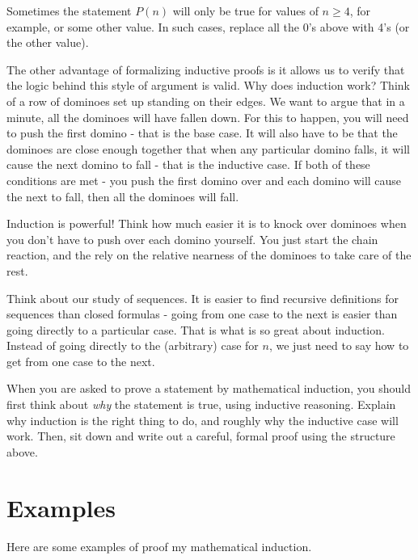 \documentclass[12pt]{article}
\begin{document}
Sometimes the statement $P(n)$ will only be true for values of $n \ge 4$, for example, or some other value.  In such cases, replace all the 0's above with 4's (or the other value).

The other advantage of formalizing inductive proofs is it allows us to verify that the logic behind this style of argument is valid.  Why does induction work?  Think of a row of dominoes set up standing on their edges.  We want to argue that in a minute, all the dominoes will have fallen down.  For this to happen, you will need to push the first domino - that is the base case.  It will also have to be that the dominoes are close enough together that when any particular domino falls, it will cause the next domino to fall - that is the inductive case.  If both of these conditions are met - you push the first domino over and each domino will cause the next to fall, then all the dominoes will fall.

Induction is powerful!  Think how much easier it is to knock over dominoes when you don't have to push over each domino yourself.  You just start the chain reaction, and the rely on the relative nearness of the dominoes to take care of the rest.  

Think about our study of sequences.  It is easier to find recursive definitions for sequences than closed formulas - going from one case to the next is easier than going directly to a particular case.  That is what is so great about induction.  Instead of going directly to the (arbitrary) case for $n$, we just need to say how to get from one case to the next.  

When you are asked to prove a statement by mathematical induction, you should first think about {\em why} the statement is true, using inductive reasoning.  Explain why induction is the right thing to do, and roughly why the inductive case will work.  Then, sit down and write out a careful, formal proof using the structure above.

\section{Examples}

Here are some examples of proof my mathematical induction.
\end{document}
